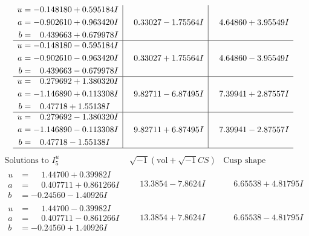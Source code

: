 \documentclass[1p]{elsarticle_modified}
\theoremstyle{definition}
\newcommand{\I}{\sqrt{-1}}
\begin{document}
$$\begin{array}{c|c|c}
\begin{aligned}
u &= -0.148180 + 0.595184 I \\
a &= -0.902610 + 0.963420 I \\
b &= \phantom{-}0.439663 + 0.679978 I\end{aligned}
 & \phantom{-}0.33027 - 1.75564 I & \phantom{-}4.64860 + 3.95549 I \\ \hline\begin{aligned}
u &= -0.148180 - 0.595184 I \\
a &= -0.902610 - 0.963420 I \\
b &= \phantom{-}0.439663 - 0.679978 I\end{aligned}
 & \phantom{-}0.33027 + 1.75564 I & \phantom{-}4.64860 - 3.95549 I \\ \hline\begin{aligned}
u &= \phantom{-}0.279692 + 1.380320 I \\
a &= -1.146890 + 0.113308 I \\
b &= \phantom{-}0.47718 + 1.55138 I\end{aligned}
 & \phantom{-}9.82711 - 6.87495 I & \phantom{-}7.39941 + 2.87557 I \\ \hline\begin{aligned}
u &= \phantom{-}0.279692 - 1.380320 I \\
a &= -1.146890 - 0.113308 I \\
b &= \phantom{-}0.47718 - 1.55138 I\end{aligned}
 & \phantom{-}9.82711 + 6.87495 I & \phantom{-}7.39941 - 2.87557 I\\
 \hline 
 \end{array}$$\newpage$$\begin{array}{c|c|c}  
\text{Solutions to }I^u_{5}& \I (\text{vol} + \sqrt{-1}CS) & \text{Cusp shape}\\
 \hline 
\begin{aligned}
u &= \phantom{-}1.44700 + 0.39982 I \\
a &= \phantom{-}0.407711 + 0.861266 I \\
b &= -0.24560 - 1.40926 I\end{aligned}
 & \phantom{-}13.3854 - 7.8624 I & \phantom{-}6.65538 + 4.81795 I \\ \hline\begin{aligned}
u &= \phantom{-}1.44700 - 0.39982 I \\
a &= \phantom{-}0.407711 - 0.861266 I \\
b &= -0.24560 + 1.40926 I\end{aligned}
 & \phantom{-}13.3854 + 7.8624 I & \phantom{-}6.65538 - 4.81795 I \\ \hline\begin{aligned}

\end{aligned}
\end{array}$$
\end{document}
